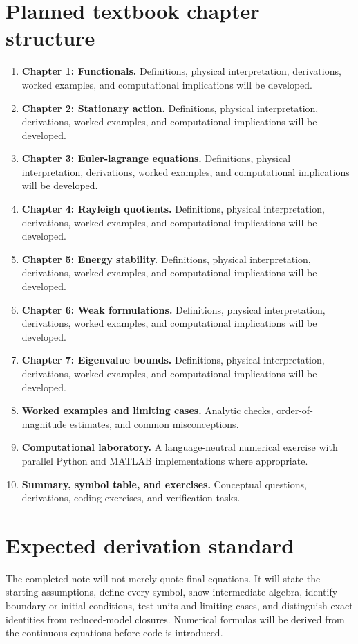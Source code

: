 \documentclass[11pt]{article}
\begin{document}
\section{Planned textbook chapter structure}
\begin{enumerate}[leftmargin=1.8em]
\item \textbf{Chapter 1: Functionals.} Definitions, physical interpretation, derivations, worked examples, and computational implications will be developed.
\item \textbf{Chapter 2: Stationary action.} Definitions, physical interpretation, derivations, worked examples, and computational implications will be developed.
\item \textbf{Chapter 3: Euler-lagrange equations.} Definitions, physical interpretation, derivations, worked examples, and computational implications will be developed.
\item \textbf{Chapter 4: Rayleigh quotients.} Definitions, physical interpretation, derivations, worked examples, and computational implications will be developed.
\item \textbf{Chapter 5: Energy stability.} Definitions, physical interpretation, derivations, worked examples, and computational implications will be developed.
\item \textbf{Chapter 6: Weak formulations.} Definitions, physical interpretation, derivations, worked examples, and computational implications will be developed.
\item \textbf{Chapter 7: Eigenvalue bounds.} Definitions, physical interpretation, derivations, worked examples, and computational implications will be developed.
\item \textbf{Worked examples and limiting cases.} Analytic checks, order-of-magnitude estimates, and common misconceptions.
\item \textbf{Computational laboratory.} A language-neutral numerical exercise with parallel Python and MATLAB implementations where appropriate.
\item \textbf{Summary, symbol table, and exercises.} Conceptual questions, derivations, coding exercises, and verification tasks.
\end{enumerate}

\section{Expected derivation standard}
The completed note will not merely quote final equations. It will state the starting assumptions, define every symbol, show intermediate algebra, identify boundary or initial conditions, test units and limiting cases, and distinguish exact identities from reduced-model closures. Numerical formulas will be derived from the continuous equations before code is introduced.
\end{document}
